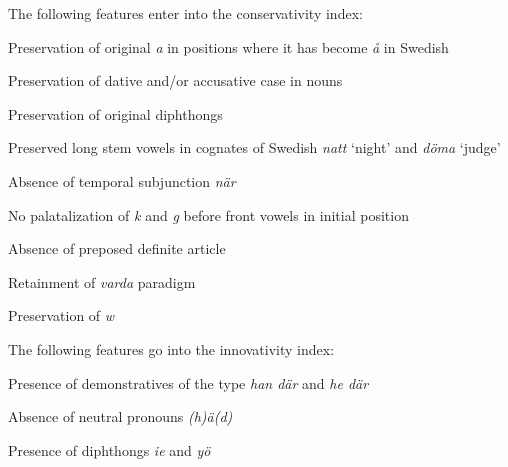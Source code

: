The following features enter into the conservativity index:

\item 

Preservation of original \textit{a} in positions where it has become \textit{å} in Swedish

\item 

Preservation of dative and/or accusative case in nouns

\item 

Preservation of original diphthongs

\item 

Preserved long stem vowels in cognates of Swedish \textit{natt} ‘night’ and \textit{döma} ‘judge’

\item 

Absence of temporal subjunction \textit{när}

\item 

No palatalization of \textit{k} and \textit{g} before front vowels in initial position

\item 

Absence of preposed definite article

\item 

Retainment of \textit{varda} paradigm

\item 

Preservation of \textit{w}


The following features go into the innovativity index:

\item 

Presence of demonstratives of the type\textit{ han där} and \textit{he där}

\item 

Absence of neutral pronouns \textit{(h)ä(d)}

\item 

Presence of diphthongs \textit{ie} and \textit{yö}

